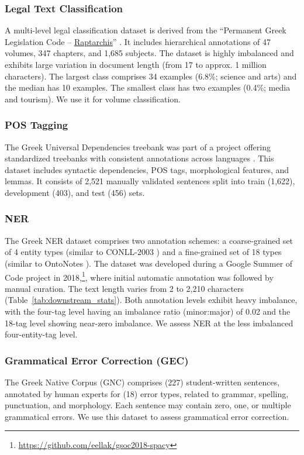 \documentclass[sigconf,review,anonymous]{acmart}
\begin{document}
\subsubsection{Legal Text Classification} A multi-level legal classification dataset is derived from the ``Permanent Greek Legislation Code – \href{https://raptarchis.gov.gr}{Raptarchis}'' \cite{papaloukas2021}. It includes hierarchical annotations of 47 volumes, 347 chapters, and 1,685 subjects. The dataset is highly imbalanced and exhibits large variation in document length (from 17 to approx. 1 million characters). The largest class comprises 34 examples (6.8\%; science and arts) and the median has 10 examples. The smallest class has two examples (0.4\%; media and tourism). We use it for volume classification.

\subsubsection{POS Tagging}
The Greek Universal Dependencies treebank was part of a project offering standardized treebanks with consistent annotations across languages \cite{nivre2016universal}. This dataset \cite{prokopidis2017universal} includes syntactic dependencies, POS tags, morphological features, and lemmas. It consists of 2,521 manually validated sentences split into train (1,622), development (403), and test (456) sets. 


\subsubsection{NER}
The Greek NER dataset \cite{Bartziokas2020} comprises two annotation schemes: a coarse-grained set of 4 entity types (similar to CONLL-2003 \cite{sang2003introduction}) and a fine-grained set of 18 types (similar to OntoNotes \cite{pradhan2007ontonotes}). The dataset was developed during a Google Summer of Code project in 2018,\footnote{\url{https://github.com/eellak/gsoc2018-spacy}}, where initial automatic annotation was followed by manual curation. The text length varies from 2 to 2,210 characters (Table~\ref{tab:downstream_stats}). Both annotation levels exhibit heavy imbalance, with the four-tag level having an imbalance ratio (minor:major) of 0.02 and the 18-tag level showing near-zero imbalance. We assess NER at the less imbalanced four-entity-tag level.


\subsubsection{Grammatical Error Correction (GEC)} 
The Greek Native Corpus (GNC) \cite{korre2021elerrant} comprises (227) student-written sentences, annotated by human experts for (18) error types, related to grammar, spelling, punctuation, and morphology. Each sentence may contain zero, one, or multiple grammatical errors.
We use this dataset to assess grammatical error correction. 
\end{document}
